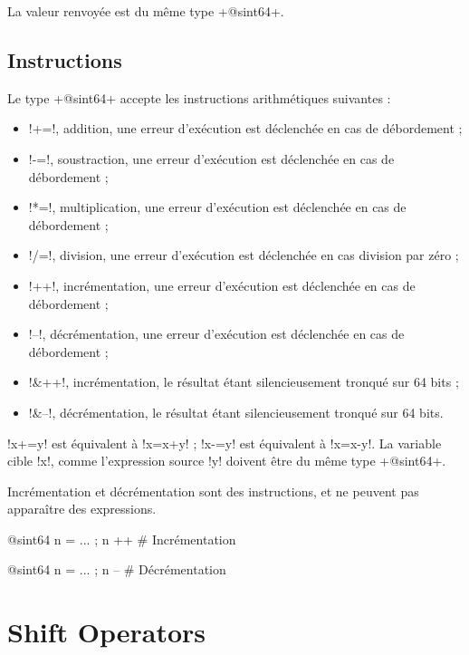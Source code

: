 La valeur renvoyée est du même type  \ggs+@sint64+.


\subsection{Instructions}

Le type \ggs+@sint64+ accepte les instructions arithmétiques suivantes :
\begin{itemize}
  \item \ggs!+=!, addition, une erreur d'exécution est déclenchée en cas de débordement ;
  \item \ggs!-=!, soustraction, une erreur d'exécution est déclenchée en cas de débordement ;
  \item \ggs!*=!, multiplication, une erreur d'exécution est déclenchée en cas de débordement ;
  \item \ggs!/=!, division, une erreur d'exécution est déclenchée en cas division par zéro ;
  \item \ggs!++!, incrémentation, une erreur d'exécution est déclenchée en cas de débordement ;
  \item \ggs!--!, décrémentation, une erreur d'exécution est déclenchée en cas de débordement ;
  \item \ggs!&++!, incrémentation, le résultat étant silencieusement tronqué sur 64 bits ;
  \item \ggs!&--!, décrémentation, le résultat étant silencieusement tronqué sur 64 bits.
\end{itemize}

\ggs!x+=y! est équivalent à \ggs!x=x+y! ; \ggs!x-=y! est équivalent à \ggs!x=x-y!.
La variable cible \ggs!x!, comme l'expression source \ggs!y! doivent être du même type \ggs+@sint64+. 

Incrémentation et décrémentation sont des instructions, et ne peuvent pas apparaître des expressions.
\begin{galgas}
@sint64 n = ... ; n ++ # Incrémentation
\end{galgas}

\begin{galgas}
@sint64 n = ... ; n -- # Décrémentation
\end{galgas}







\section{Shift Operators}


